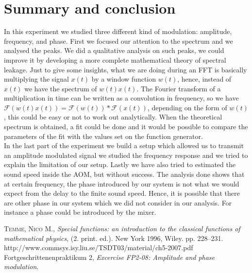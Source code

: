 \documentclass[a4paper,10pt]{article}
\begin{document}
\section{Summary and conclusion}
In this experiment we studied three different kind of modulation: amplitude, frequency, and phase. First we focused our attention to the spectrum and we analysed the peaks. We did a qualitative analysis on such peaks, we could improve it by developing a more complete mathematical theory of spectral leakage. Just to give some insights, what we are doing during an FFT is basically multiplying the signal $x(t)$ by a window function $w(t)$, hence, instead of $x(t)$ we have the spectrum of $w(t)x(t)$. The Fourier transform of a multiplication in time can be written as a convolution in frequency, so we have $\mathcal{F}(w(t)x(t)) = \mathcal{F}(w(t))*\mathcal{F}(x(t))$, depending on the form of $w(t)$, this could be easy or not to work out analytically. When the theoretical spectrum is obtained, a fit could be done and it would be possible to compare the parameters of the fit with the values set on the function generator.\\
In the last part of the experiment we build a setup which allowed us to transmit an amplitude modulated signal we studied the frequency response and we tried to explain the limitation of our setup. Lastly we have also tried to estimated the sound speed inside the AOM, but without success. The analysis done shows that at certain frequency, the phase introduced by our system is not what we would expect from the delay to the finite sound speed. Hence, it is possible that there are other phase in our system which we did not consider in our analysis. For instance a phase could be introduced by the mixer.

\begin{thebibliography}{99}
\textsc{Temme, Nico M.}, \textit{Special functions: an introduction to the classical functions of mathematical physics}, (2. print. ed.). New York 1996, Wiley. pp. 228–231. 
 http://www.commsys.isy.liu.se/TSDT03/material/ch5-2007.pdf
Fortgeschrittenenpraktikum 2, \textit{Excercise FP2-08: Amplitude and phase modulation}.
\end{thebibliography}
\end{document}
